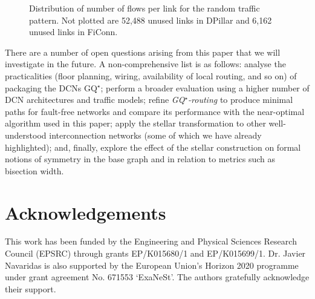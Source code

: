 \documentclass[]{amsart}
\newcommand{\knkthreecol}{blue!70!black}
\newcommand{\knkfourcol}{purple!25!white}
\newcommand{\ficonncol}{green!60!black}
\begin{document}
{\begin{figure}[t]

\caption{Distribution of number of flows per link for the random traffic pattern.  Not plotted are  52,488 unused links in DPillar and 6,162 unused links in FiConn.
}
\label{plot:rnd_flows}
\end{figure}

There are a number of open questions arising from this paper that we
will investigate in the future.  A non-comprehensive list is as
follows: analyse the practicalities (floor planning, wiring,
availability of local routing, and so on) of packaging the DCNs GQ$^\star$; perform a
broader evaluation using a higher number of DCN architectures and
traffic models; refine \emph{GQ$^\star$-routing\/} to produce minimal paths for
fault-free networks and compare its performance with the near-optimal
algorithm used in this paper; apply the stellar transformation to
other well-understood interconnection networks (some of which we have already highlighted); and, finally, explore the effect of
the stellar construction on formal notions of symmetry in the base
graph and in relation to metrics such as bisection width.


\section*{Acknowledgements }
This work has been funded by the Engineering and Physical Sciences
Research Council (EPSRC) through grants EP/K015680/1 and EP/K015699/1. Dr. Javier Navaridas is also supported by the European Union's Horizon 2020 programme under grant agreement No. 671553 `ExaNeSt'. The authors gratefully acknowledge their support.
 
}
\end{document}
